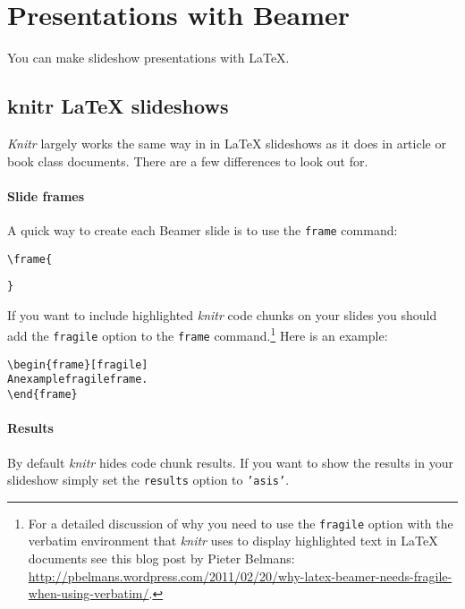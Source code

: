 \section{Presentations with Beamer}

You can make slideshow presentations with LaTeX. 

\subsection{knitr LaTeX slideshows}
{\emph{Knitr}} largely works the same way in in LaTeX slideshows as it does in article or book class documents. There are a few differences to look out for. 

\paragraph{Slide frames}

A quick way to create each Beamer slide is to use the \texttt{frame} command:

\begin{knitrout}
\color{fgcolor}\begin{kframe}
\begin{alltt}

\textbackslash{}frame\{

\}
\end{alltt}
\end{kframe}
\end{knitrout}


\noindent If you want to include highlighted {\emph{knitr}} code chunks on your slides you should add the \texttt{fragile} option to the \texttt{frame} command.\footnote{For a detailed discussion of why you need to use the \texttt{fragile} option with the verbatim environment that {\emph{knitr}} uses to display highlighted text in LaTeX documents see this blog post by Pieter Belmans: \url{http://pbelmans.wordpress.com/2011/02/20/why-latex-beamer-needs-fragile-when-using-verbatim/}.} Here is an example:

\begin{knitrout}
\color{fgcolor}\begin{kframe}
\begin{alltt}
\textbackslash{}begin\{frame\}[fragile]
    An example fragile frame.
\textbackslash{}end\{frame\}
\end{alltt}
\end{kframe}
\end{knitrout}


\paragraph{Results}

By default {\emph{knitr}} hides code chunk results. If you want to show the results in your slideshow simply set the {\tt{results}} option to {\tt{'asis'}}.
